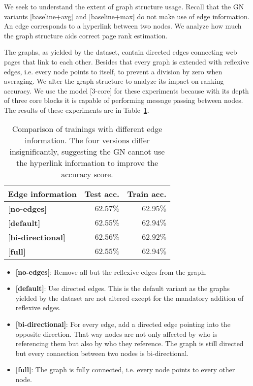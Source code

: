 We seek to understand the extent of graph structure usage. Recall that the GN variants [baseline+avg] and [baseline+max] do not make use of edge information. An edge corresponds to a hyperlink between two nodes. We analyze how much the graph structure aids correct page rank estimation.

The graphs, as yielded by the dataset, contain directed edges connecting web pages that link to each other. Besides that every graph is extended with reflexive edges, i.e. every node points to itself, to prevent a division by zero when averaging. We alter the graph structure to analyze its impact on ranking accuracy. We use the model [3-core] for these experiments because with its depth of three core blocks it is capable of performing message passing between nodes. The results of these experiments are in Table~\ref{tab:edgecomparison}.

\begin{table}
    \centering
    \begin{tabular}{lrr}
        \textbf{Edge information} & \textbf{Test acc.} & \textbf{Train acc.}\\\hline
        \textbf{[no-edges]} & $\bm{62.57\%}$ & $\bm{62.95\%}$\\
        \textbf{[default]} & $62.55\%$ & $62.94\%$\\
        \textbf{[bi-directional]} & $62.56\%$ & $62.92\%$\\
        \textbf{[full]} & $62.55\%$ & $62.94\%$\\
    \end{tabular}
    \caption[Comparison of trainings with different edge information]{Comparison of trainings with different edge information. The four versions differ insignificantly, suggesting the GN cannot use the hyperlink information to improve the accuracy score.}
    \label{tab:edgecomparison}
\end{table}

\begin{itemize}
    \item \textbf{[no-edges]}: Remove all but the reflexive edges from the graph.
    \item \textbf{[default]}: Use directed edges. This is the default variant as the graphs yielded by the dataset are not altered except for the mandatory addition of reflexive edges.
    \item \textbf{[bi-directional]}: For every edge, add a directed edge pointing into the opposite direction. That way nodes are not only affected by who is referencing them but also by who they reference. The graph is still directed but every connection between two nodes is bi-directional.
    \item \textbf{[full]}: The graph is fully connected, i.e. every node points to every other node.
\end{itemize}

